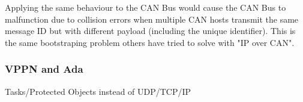 Applying the same behaviour to the CAN Bus would cause the CAN Bus to
malfunction due to collision errors when multiple CAN hosts transmit the same
message ID but with different payload (including the unique identifier).
This is the same bootstraping problem others have tried to solve with
"IP over CAN".

\subsubsection{VPPN and Ada}
Tasks/Protected Objects instead of UDP/TCP/IP

%
